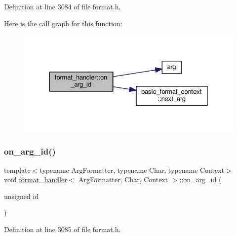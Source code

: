 Definition at line 3084 of file format.\+h.

Here is the call graph for this function\+:
\nopagebreak
\begin{figure}[H]
\begin{center}
\leavevmode
\includegraphics[width=324pt]{structformat__handler_a68a3fd78bb89496cb6b27f67b0ecb168_cgraph}
\end{center}
\end{figure}
\mbox{\label{structformat__handler_a7af75f0c8c9bfd281525c23c557610df}} 
\subsubsection{\texorpdfstring{on\+\_\+arg\+\_\+id()}{on\_arg\_id()}\hspace{0.1cm}{\footnotesize\ttfamily [2/3]}}
{\footnotesize\ttfamily template$<$typename Arg\+Formatter, typename Char, typename Context$>$ \\
void \hyperlink{structformat__handler}{format\+\_\+handler}$<$ Arg\+Formatter, Char, Context $>$\+::on\+\_\+arg\+\_\+id (\begin{DoxyParamCaption}\item[{unsigned}]{id }\end{DoxyParamCaption})\hspace{0.3cm}{\ttfamily [inline]}}



Definition at line 3085 of file format.\+h.

